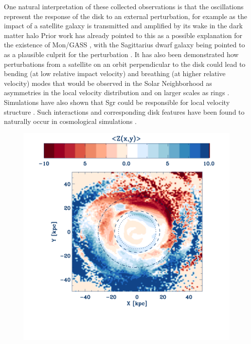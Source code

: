 \documentclass[galaxies,article,submit,moreauthors,pdftex,10pt,a4paper]{mdpi}
\begin{document}
One natural interpretation of these collected observations is that the oscillations represent the response of the disk to an external perturbation, for example as the impact of a satellite galaxy is transmitted and amplified by its wake in the dark matter halo \cite[as described for the LMC in][]{weinberg06}
Prior work has already pointed to this as a possible explanation for the existence of Mon/GASS \cite{kazantzidis08,younger08}, with the Sagittarius dwarf galaxy being pointed to as a plausible culprit for the perturbation \cite{purcell11}.
It has also been demonstrated how perturbations from a satellite on an orbit perpendicular to the disk could lead to bending (at low relative impact velocity) and breathing (at higher relative velocity) modes that would be observed in the Solar Neighborhood as asymmetries in the local velocity distribution  \cite{widrow14} and on larger scales as rings \cite{donghia16}.
Simulations have also shown that Sgr could be responsible for local velocity structure  \cite{gomez13}.
Such interactions and corresponding disk features have been found to naturally occur in cosmological simulations \cite{gomez16}.

\begin{figure}[ht!]
\centering
\includegraphics[width=5 in]{figures/simulation.pdf}
\caption{\label{fig:chervin}
}
\end{figure}
\end{document}

